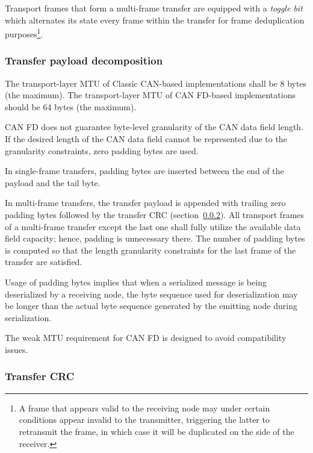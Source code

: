 Transport frames that form a multi-frame transfer are equipped with a \emph{toggle bit}
which alternates its state every frame within the transfer for frame deduplication purposes\footnote{%
    A frame that appears valid to the receiving node may under certain conditions appear invalid to the transmitter,
    triggering the latter to retransmit the frame, in which case it will be duplicated on the side of the receiver.
}.

\subsubsection{Transfer payload decomposition}

The transport-layer MTU of Classic CAN-based implementations shall be 8 bytes (the maximum).
The transport-layer MTU of CAN FD-based implementations should be 64 bytes (the maximum).

CAN FD does not guarantee byte-level granularity of the CAN data field length.
If the desired length of the CAN data field cannot be represented due to the granularity constraints,
zero padding bytes are used.

In single-frame transfers, padding bytes are inserted between the end of the payload and the tail byte.

In multi-frame transfers, the transfer payload is appended with trailing zero padding bytes
followed by the transfer CRC (section~\ref{sec:transport_can_transfer_crc}).
All transport frames of a multi-frame transfer except the last one shall fully utilize the available
data field capacity; hence, padding is unnecessary there.
The number of padding bytes is computed so that the length granularity constraints
for the last frame of the transfer are satisfied.

\begin{remark}
    Usage of padding bytes implies that when a serialized message is being deserialized by a receiving node,
    the byte sequence used for deserialization may be longer than the actual byte sequence generated by the
    emitting node during serialization.

    The weak MTU requirement for CAN FD is designed to avoid compatibility issues.
\end{remark}

\subsubsection{Transfer CRC}\label{sec:transport_can_transfer_crc}

